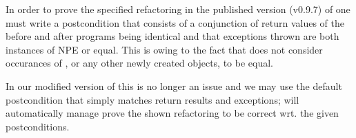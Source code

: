 In order to prove the specified  refactoring in the published version (v0.9.7) of \Refinity{} one must write a postcondition that consists of a conjunction of return values of the before and after programs being identical and
that exceptions thrown are both instances of NPE or equal.
This is owing to the fact that \Refinity{} does not consider occurances of , or any other newly created objects, to be equal.

In our modified version of \Refinity{} this is no longer an issue and we may use the default postcondition that simply matches return results and exceptions;
\Refinity{} will automatically manage prove the shown  refactoring to be correct wrt. the given postconditions.


